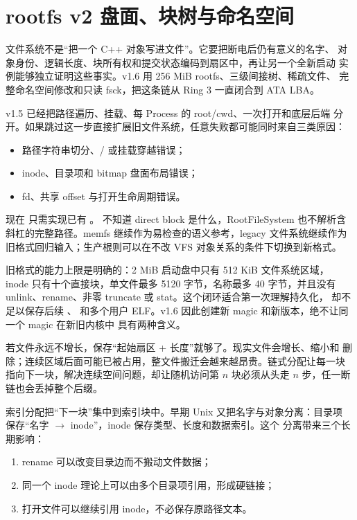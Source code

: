 \section{rootfs v2 盘面、块树与命名空间}

\begin{keyidea}
文件系统不是“把一个 C++ 对象写进文件”。它要把断电后仍有意义的名字、
对象身份、逻辑长度、块所有权和提交状态编码到扇区中，再让另一个全新启动
实例能够独立证明这些事实。v1.6 用 256 MiB rootfs、三级间接树、稀疏文件、
完整命名空间修改和只读 fsck，把这条链从 Ring 3 一直闭合到 ATA LBA。
\end{keyidea}

v1.5 已经把路径遍历、挂载、每 Process 的 root/cwd、一次打开和底层后端
分开。如果跳过这一步直接扩展旧文件系统，任意失败都可能同时来自三类原因：

\begin{itemize}
  \item 路径字符串切分、/ 或挂载穿越错误；
  \item inode、目录项和 bitmap 盘面布局错误；
  \item fd、共享 offset 与打开生命周期错误。
\end{itemize}

现在  只需实现已有 。
 不知道 direct block 是什么，RootFileSystem 也不解析含
斜杠的完整路径。memfs 继续作为易检查的语义参考，legacy 文件系统继续作为
旧格式回归输入；生产根则可以在不改 VFS 对象关系的条件下切换到新格式。

旧格式的能力上限是明确的：2 MiB 启动盘中只有 512 KiB 文件系统区域，
inode 只有十个直接块，单文件最多 5120 字节，名称最多 40 字节，并且没有
unlink、rename、非零 truncate 或 stat。这个闭环适合第一次理解持久化，
却不足以保存后续 、 和多个用户
ELF。v1.6 因此创建新 magic 和新版本，绝不让同一个 magic 在新旧内核中
具有两种含义。

若文件永远不增长，保存“起始扇区 + 长度”就够了。现实文件会增长、缩小和
删除；连续区域后面可能已被占用，整文件搬迁会越来越昂贵。链式分配让每一块
指向下一块，解决连续空间问题，却让随机访问第 \(n\) 块必须从头走 \(n\)
步，任一断链也会丢掉整个后缀。

索引分配把“下一块”集中到索引块中。早期 Unix 又把名字与对象分离：目录项
保存“名字 \(\rightarrow\) inode”，inode 保存类型、长度和数据索引。这个
分离带来三个长期影响：

\begin{enumerate}
  \item rename 可以改变目录边而不搬动文件数据；
  \item 同一个 inode 理论上可以由多个目录项引用，形成硬链接；
  \item 打开文件可以继续引用 inode，不必保存原路径文本。
\end{enumerate}

